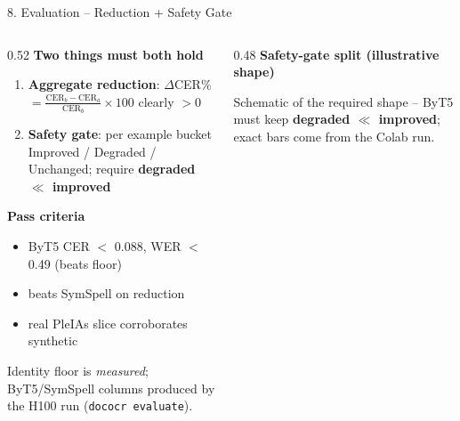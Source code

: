 \documentclass[10pt,aspectratio=169]{beamer}
\begin{document}
\begin{frame}{8. Evaluation -- Reduction + Safety Gate}
\begin{columns}[T]
\begin{column}{0.52\textwidth}
\textbf{Two things must both hold}
\begin{enumerate}\small
  \item \textbf{Aggregate reduction}: $\Delta$CER\% $=\frac{\text{CER}_{b}-\text{CER}_{a}}{\text{CER}_{b}}\times100$ clearly $>$0
  \item \textbf{Safety gate}: per example bucket Improved / Degraded / Unchanged; require \textbf{degraded $\ll$ improved}
\end{enumerate}
\textbf{Pass criteria}
\begin{itemize}\small
  \item ByT5 CER $<$ 0.088, WER $<$ 0.49 (beats floor)
  \item beats SymSpell on reduction
  \item real PleIAs slice corroborates synthetic
\end{itemize}
\scriptsize Identity floor is \emph{measured}; ByT5/SymSpell columns produced by the H100 run (\texttt{dococr evaluate}).
\end{column}
\begin{column}{0.48\textwidth}
\textbf{Safety-gate split (illustrative shape)}

\scriptsize Schematic of the required shape -- ByT5 must keep \textbf{degraded $\ll$ improved}; exact bars come from the Colab run.
\end{column}
\end{columns}
\end{frame}
\end{document}
